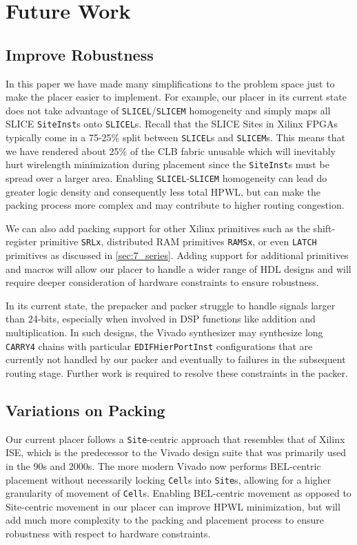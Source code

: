 \section{Future Work}


\subsection{Improve Robustness}
In this paper we have made many simplifications to the problem space just to make the placer easier to implement.
For example, our placer in its current state does not take advantage of \texttt{SLICEL}/\texttt{SLICEM} homogeneity and simply maps all SLICE \texttt{SiteInst}s onto \texttt{SLICEL}s. 
Recall that the SLICE Sites in Xilinx FPGAs typically come in a 75-25\% split between \texttt{SLICEL}s and \texttt{SLICEM}s. 
This means that we have rendered about 25\% of the CLB fabric unusable which will inevitably hurt wirelength minimization during placement since the \texttt{SiteInst}s must be spread over a larger area. 
Enabling \texttt{SLICEL}-\texttt{SLICEM} homogeneity can lead do greater logic density and consequently less total HPWL, but can make the packing process more complex and may contribute to higher routing congestion.

We can also add packing support for other Xilinx primitives such as the shift-register primitive \texttt{SRLx}, distributed RAM primitives \texttt{RAMSx}, or even \texttt{LATCH} primitives as discussed in \ref{sec:7_series}.
Adding support for additional primitives and macros will allow our placer to handle a wider range of HDL designs and will require deeper consideration of hardware constraints to ensure robustness.

In its current state, the prepacker and packer struggle to handle signals larger than 24-bits, especially when involved in DSP functions like addition and multiplication. 
In such designs, the Vivado synthesizer may synthesize long \texttt{CARRY4} chains with particular \texttt{EDIFHierPortInst} configurations that are currently not handled by our packer and eventually to failures in the subsequent routing stage.
Further work is required to resolve these constraints in the packer.


\subsection{Variations on Packing}
Our current placer follows a \texttt{Site}-centric approach that resembles that of Xilinx ISE, which is the predecessor to the Vivado design suite that was primarily used in the 90s and 2000s.
The more modern Vivado now performs BEL-centric placement without necessarily locking \texttt{Cell}s into \texttt{Site}s, allowing for a higher granularity of movement of \texttt{Cell}s. 
Enabling BEL-centric movement as opposed to Site-centric movement in our placer can improve HPWL minimization, but will add much more complexity to the packing and placement process to ensure robustness with respect to hardware constraints.

